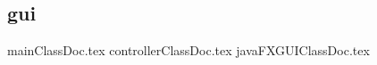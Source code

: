 \subsection{gui}
\label{ss:gui}
\FloatBarrier

{mainClassDoc.tex}
{controllerClassDoc.tex}
{javaFXGUIClassDoc.tex}